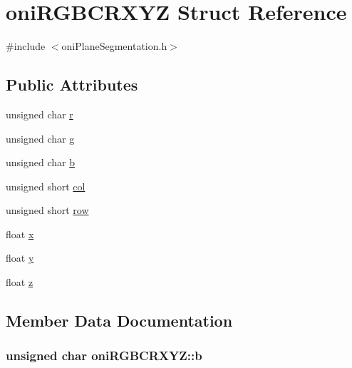 \hypertarget{structoni_r_g_b_c_r_x_y_z}{}\section{oni\+R\+G\+B\+C\+R\+X\+Y\+Z Struct Reference}
\label{structoni_r_g_b_c_r_x_y_z}


{\ttfamily \#include $<$oni\+Plane\+Segmentation.\+h$>$}

\subsection*{Public Attributes}
\begin{DoxyCompactItemize}
\item 
unsigned char \hyperlink{structoni_r_g_b_c_r_x_y_z_ab548d9d2d77446ba839124630eba4cd1}{r}
\item 
unsigned char \hyperlink{structoni_r_g_b_c_r_x_y_z_ad205110931dbbf0fda04e3b0ad2e26bd}{g}
\item 
unsigned char \hyperlink{structoni_r_g_b_c_r_x_y_z_a5441379b45133c8d2db7dc4d7e04a1bb}{b}
\item 
unsigned short \hyperlink{structoni_r_g_b_c_r_x_y_z_a66042f0ffba0616df5098f0ae276ed57}{col}
\item 
unsigned short \hyperlink{structoni_r_g_b_c_r_x_y_z_aaee0318f6df1fcc2e70f641d1f603d90}{row}
\item 
float \hyperlink{structoni_r_g_b_c_r_x_y_z_a5cb3b825ea9f2744df1dbc90af7f8d26}{x}
\item 
float \hyperlink{structoni_r_g_b_c_r_x_y_z_a7359bd5770d4685c717c634451b33337}{y}
\item 
float \hyperlink{structoni_r_g_b_c_r_x_y_z_aa4745113704723d9220f40f77d67df5c}{z}
\end{DoxyCompactItemize}


\subsection{Member Data Documentation}
\hypertarget{structoni_r_g_b_c_r_x_y_z_a5441379b45133c8d2db7dc4d7e04a1bb}{}
\subsubsection[{b}]{\setlength{\rightskip}{0pt plus 5cm}unsigned char oni\+R\+G\+B\+C\+R\+X\+Y\+Z\+::b}\label{structoni_r_g_b_c_r_x_y_z_a5441379b45133c8d2db7dc4d7e04a1bb}
\hypertarget{structoni_r_g_b_c_r_x_y_z_a66042f0ffba0616df5098f0ae276ed57}{}
